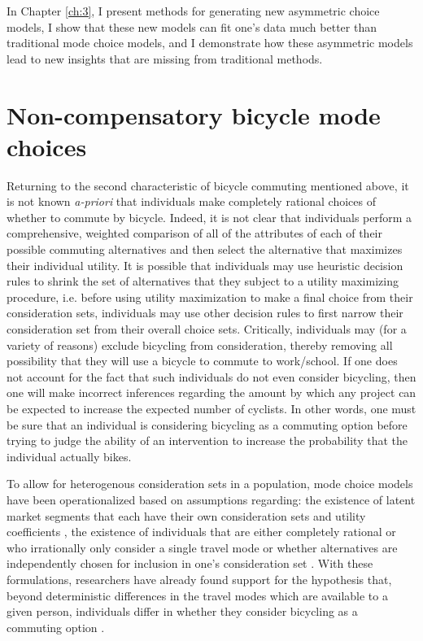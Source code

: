 In Chapter \ref{ch:3}, I present methods for generating new asymmetric choice models, I show that these new models can fit one's data much better than traditional mode choice models, and I demonstrate how these asymmetric models lead to new insights that are missing from traditional methods.

\section{Non-compensatory bicycle mode choices}
\label{sec:irrational_choices}
Returning to the second characteristic of bicycle commuting mentioned above, it is not known \textit{a-priori} that individuals make completely rational choices of whether to commute by bicycle. Indeed, it is not clear that individuals perform a comprehensive, weighted comparison of all of the attributes of each of their possible commuting alternatives and then select the alternative that maximizes their individual utility. It is possible that individuals may use heuristic decision rules to shrink the set of alternatives that they subject to a utility maximizing procedure, i.e. before using utility maximization to make a final choice from their consideration sets, individuals may use other decision rules to first narrow their consideration set from their overall choice sets. Critically, individuals may (for a variety of reasons) exclude bicycling from consideration, thereby removing all possibility that they will use a bicycle to commute to work/school. If one does not account for the fact that such individuals do not even consider bicycling, then one will make incorrect inferences regarding the amount by which any project can be expected to increase the expected number of cyclists. In other words, one must be sure that an individual is considering bicycling as a commuting option before trying to judge the ability of an intervention to increase the probability that the individual actually bikes.

To allow for heterogenous consideration sets in a population, mode choice models have been operationalized based on assumptions regarding: the existence of latent market segments that each have their own consideration sets and utility coefficients \citep{vij_incorporating_2013, vij_preference_2014}, the existence of individuals that are either completely rational or who irrationally only consider a single travel mode \citep{swait_incorporating_1987} or whether alternatives are independently chosen for inclusion in one's consideration set \citep{swait_empirical_1987, swait_choice_2001, swait_choice_2009}. With these formulations, researchers have already found support for the hypothesis that, beyond deterministic differences in the travel modes which are available to a given person, individuals differ in whether they consider bicycling as a commuting option \citep{swait_choice_2009, vij_preference_2014, mahmoud_latent_2015}.

